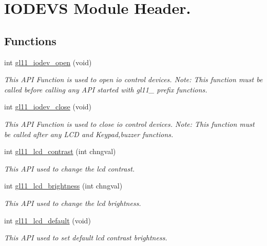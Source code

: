 \hypertarget{group__A}{\section{I\+O\+D\+E\+V\+S Module Header.}
\label{group__A}
}
\subsection*{Functions}
\begin{DoxyCompactItemize}
\item 
int \hyperlink{group__A_ga82a55216b80b79a47fbabadec00c5a5f}{gl11\+\_\+iodev\+\_\+open} (void)
\begin{DoxyCompactList}\small\item\em This A\+P\+I Function is used to open io control devices. Note\+: This function must be called before calling any A\+P\+I started with gl11\+\_\+ prefix functions. \end{DoxyCompactList}\item 
int \hyperlink{group__A_ga86ceb9f93c2358e2e1ac755f22084960}{gl11\+\_\+iodev\+\_\+close} (void)
\begin{DoxyCompactList}\small\item\em This A\+P\+I Function is used to close io control devices. Note\+: This function must be called after any L\+C\+D and Keypad,buzzer functions. \end{DoxyCompactList}\item 
int \hyperlink{group__A_gaaaa41f0eb4292051f8e42b1b3ee73fde}{gl11\+\_\+lcd\+\_\+contrast} (int chngval)
\begin{DoxyCompactList}\small\item\em This A\+P\+I used to change the lcd contrast. \end{DoxyCompactList}\item 
int \hyperlink{group__A_ga5626128851f2aa7c81fac7a2fdcddf4e}{gl11\+\_\+lcd\+\_\+brightness} (int chngval)
\begin{DoxyCompactList}\small\item\em This A\+P\+I used to change the lcd brightness. \end{DoxyCompactList}\item 
int \hyperlink{group__A_gafc9600c2f4af0154db76f633ced40296}{gl11\+\_\+lcd\+\_\+default} (void)
\begin{DoxyCompactList}\small\item\em This A\+P\+I used to set default lcd contrast brightness. \end{DoxyCompactList}\item 

\end{DoxyCompactItemize}
